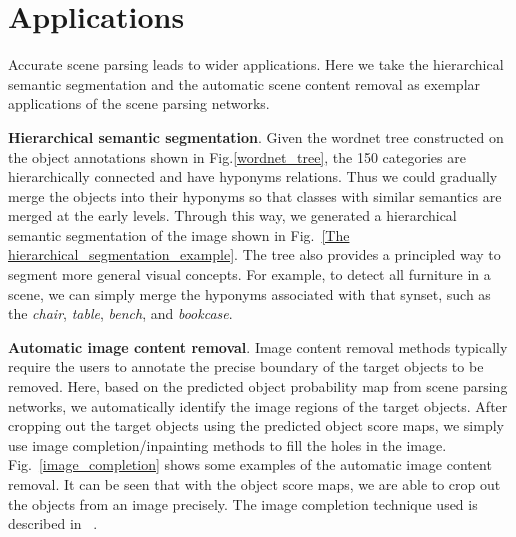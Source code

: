 \section{Applications}
\label{section:applications}

Accurate scene parsing leads to wider applications. Here we take the hierarchical semantic segmentation and the automatic scene content removal as exemplar applications of the scene parsing networks. 

\textbf{Hierarchical semantic segmentation}. Given the wordnet tree constructed on the object annotations shown in Fig.\ref{wordnet_tree}, the 150 categories are hierarchically connected and have hyponyms relations. Thus we could gradually merge the objects into their hyponyms so that classes with similar semantics are merged at the early levels. Through this way, we generated a hierarchical semantic segmentation of the image shown in Fig.~\ref{The hierarchical_segmentation_example}. The tree also provides a principled way to segment more general visual concepts. For example, to detect all furniture in a scene, we can simply merge the hyponyms associated with that synset, such as the \textit{chair}, \textit{table}, \textit{bench}, and \textit{bookcase}.

\textbf{Automatic image content removal}. Image content removal methods typically require the users to annotate the precise boundary of the target objects to be removed. Here, based on the predicted object probability map from scene parsing networks, we automatically identify the image regions of the target objects. After cropping out the target objects using the predicted object score maps, we simply use image completion/inpainting methods to fill the holes in the image. Fig.~\ref{image_completion} shows some examples of the automatic image content removal. It can be seen that with the object score maps, we are able to crop out the objects from an image precisely. The image completion technique used is described in ~\citep{huang2014image}.

